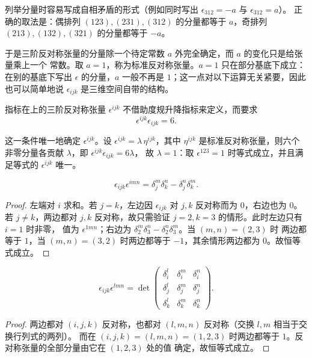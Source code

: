 \begin{remark}
列举分量时容易写成自相矛盾的形式（例如同时写出 $\epsilon_{312}=-a$ 与 $\epsilon_{312}=a$）。
正确的取法是：偶排列 $(123),(231),(312)$ 的分量都等于 $a$，奇排列 $(213),(132),(321)$
的分量都等于 $-a$。
\end{remark}

于是三阶反对称张量的分量除一个待定常数 $a$ 外完全确定，而 $a$ 的变化只是给张量乘上一个
常数。取 $a=1$，称为标准反对称张量。$a=1$ 只在部分基底下成立：在别的基底下写出 $\epsilon$
的分量，$a$ 一般不再是 $1$；这一点对以下运算无关紧要，因此也可以简单地说 $\epsilon_{ijk}$
是三维空间自带的结构。

\begin{definition}
指标在上的三阶反对称张量 $\epsilon^{ijk}$ 不借助度规升降指标来定义，而要求
\[
\epsilon^{ijk}\epsilon_{ijk}=6 .
\]
\end{definition}

这一条件唯一地确定 $\epsilon^{ijk}$。设 $\epsilon^{ijk}=\lambda\,\eta^{ijk}$，其中 $\eta^{ijk}$
是标准反对称张量，则六个非零分量各贡献 $\lambda$，即 $\epsilon^{ijk}\epsilon_{ijk}=6\lambda$，
故 $\lambda=1$：取 $\epsilon^{123}=1$ 时等式成立，并且满足等式的 $\epsilon^{ijk}$ 唯一。

\begin{proposition}
\[
\epsilon_{ijk}\epsilon^{imn}=\delta^m_j\delta^n_k-\delta^n_j\delta^m_k .
\]
\end{proposition}

\begin{proof}
左端对 $i$ 求和。若 $j=k$，左边因 $\epsilon_{ijk}$ 对 $j,k$ 反对称而为 $0$，右边也为 $0$。
若 $j\ne k$，两边都对 $j,k$ 反对称，故只需验证 $j=2,k=3$ 的情形。此时左边只有 $i=1$ 时非零，
值为 $\epsilon^{1mn}$；右边为 $\delta^m_2\delta^n_3-\delta^n_2\delta^m_3$。当 $(m,n)=(2,3)$ 时
两边都等于 $1$，当 $(m,n)=(3,2)$ 时两边都等于 $-1$，其余情形两边都为 $0$。故恒等式成立。
\end{proof}

\begin{proposition}
\[
\epsilon_{ijk}\epsilon^{lmn}=
\det\begin{pmatrix}
\delta^l_i & \delta^m_i & \delta^n_i\\
\delta^l_j & \delta^m_j & \delta^n_j\\
\delta^l_k & \delta^m_k & \delta^n_k
\end{pmatrix}.
\]
\end{proposition}

\begin{proof}
两边都对 $(i,j,k)$ 反对称，也都对 $(l,m,n)$ 反对称（交换 $l,m$ 相当于交换行列式的两列）。
而在 $(i,j,k)=(l,m,n)=(1,2,3)$ 时两边都等于 $1$。反对称张量的全部分量由它在 $(1,2,3)$ 处的值
确定，故恒等式成立。
\end{proof}

